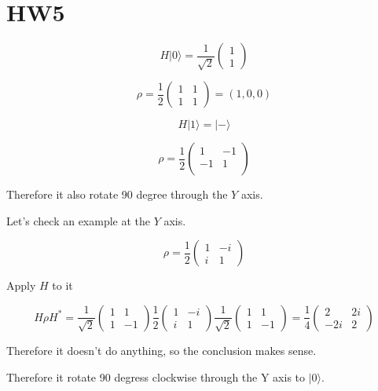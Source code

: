 \documentclass{article}%
\newcommand{\kt}[1]{|#1\rangle}
\begin{document}
\section*{HW5}

$$
H \kt{0} = \frac{1}{\sqrt{2}} \begin{pmatrix} 
            1\\
            1 
        \end{pmatrix}
$$

$$
\rho = \frac{1}{2} \begin{pmatrix} 
    1 & 1\\
    1 & 1 
\end{pmatrix} = (1, 0, 0)
$$

$$
H \kt{1} = \kt{-}
$$

$$
\rho=\frac{1}{2} \begin{pmatrix} 
    1 & -1\\
    -1 & 1\\ 
\end{pmatrix} 
$$

Therefore it also rotate 90 degree through the $Y$ axis.

Let's check an example at the $Y$ axis.

$$
\rho=\frac{1}{2}\begin{pmatrix}
    1 & -i\\
    i & 1
\end{pmatrix}
$$

Apply $H$ to it

$$
H \rho H^* = \frac{1}{\sqrt{2}}\begin{pmatrix} 
    1 & 1\\
    1 & -1 
\end{pmatrix} \frac{1}{2}\begin{pmatrix}
    1 & -i\\
    i & 1
\end{pmatrix} \frac{1}{\sqrt{2}}\begin{pmatrix} 
    1 & 1\\
    1 & -1 
\end{pmatrix} 
= \frac{1}{4}\begin{pmatrix} 
    2 & 2i\\
    -2i & 2 
\end{pmatrix}
$$

Therefore it doesn't do anything, so the conclusion makes sense.


Therefore it rotate 90 degress clockwise through the Y axis to $\kt{0}$.
\end{document}
